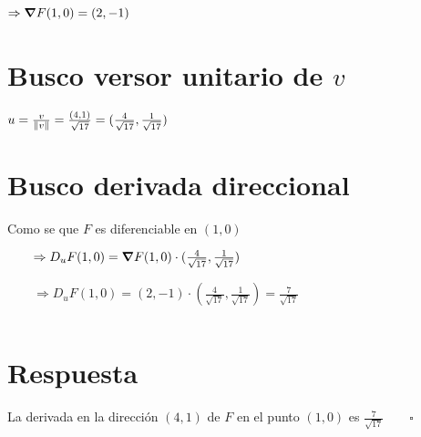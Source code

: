 \documentclass[../parcial.tex]{subfiles}
\begin{document}
    $ \Rightarrow \grad F(1,0) = (2,-1) $

    \section*{Busco versor unitario de $v$}

    $ u = \frac{v}{\norm*{v}} = \frac{(4,1)}{\sqrt{17}} = (\frac{4}{\sqrt{17}}, \frac{1}{\sqrt{17}}) $

    \section*{Busco derivada direccional}

    Como se que $F$ es diferenciable en $(1,0)$

    $\qquad \Rightarrow D_uF(1,0) = \grad F(1,0) \cdot (\frac{4}{\sqrt{17}}, \frac{1}{\sqrt{17}})$

    $\qquad \Rightarrow D_uF(1,0) = (2,-1) \cdot (\frac{4}{\sqrt{17}}, \frac{1}{\sqrt{17}}) = \frac{7}{\sqrt{17}}$

    $ $

    \section*{Respuesta}

    La derivada en la dirección $(4,1)$ de $F$ en el punto $(1,0)$ es $\frac{7}{\sqrt{17}} \qquad \square$
\end{document}

